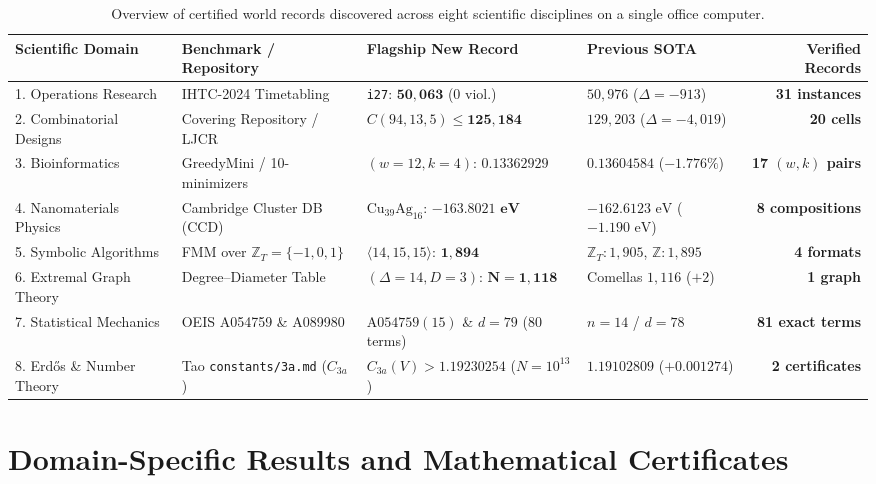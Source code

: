 \documentclass[11pt,a4paper]{article}
\begin{document}
\begin{table}[htbp]
\centering
\caption{Overview of certified world records discovered across eight scientific disciplines on a single office computer.}
\label{tab:summary}
\small
\begin{tabular}{@{}llllr@{}}
\toprule
\textbf{Scientific Domain} & \textbf{Benchmark / Repository} & \textbf{Flagship New Record} & \textbf{Previous SOTA} & \textbf{Verified Records} \\
\midrule
1. Operations Research & IHTC-2024 Timetabling & \texttt{i27}: $\mathbf{50{,}063}$ ($0$ viol.) & $50{,}976$ ($\Delta = -913$) & \textbf{31 instances} \\
2. Combinatorial Designs & Covering Repository / LJCR & $C(94,13,5) \le \mathbf{125{,}184}$ & $129{,}203$ ($\Delta = -4{,}019$) & \textbf{20 cells} \\
3. Bioinformatics & GreedyMini / 10-minimizers & $(w{=}12,k{=}4)$: $\mathbf{0.13362929}$ & $0.13604584$ ($-1.776\%$) & \textbf{17 $(w,k)$ pairs} \\
4. Nanomaterials Physics & Cambridge Cluster DB (CCD) & $\text{Cu}_{39}\text{Ag}_{16}$: $\mathbf{-163.8021\text{ eV}}$ & $-162.6123\text{ eV}$ ($-1.190\text{ eV}$) & \textbf{8 compositions} \\
5. Symbolic Algorithms & FMM over $\mathbb{Z}_T=\{-1,0,1\}$ & $\langle 14,15,15\rangle$: $\mathbf{1{,}894}$ & $\mathbb{Z}_T{:}1{,}905$, $\mathbb{Z}{:}1{,}895$ & \textbf{4 formats} \\
6. Extremal Graph Theory & Degree--Diameter Table & $(\Delta{=}14,D{=}3)$: $\mathbf{N=1{,}118}$ & Comellas $1{,}116$ ($+2$) & \textbf{1 graph} \\
7. Statistical Mechanics & OEIS A054759 \& A089980 & $\text{A054759}(15)$ \& $d{=}79$ (80 terms) & $n=14$ / $d=78$ & \textbf{81 exact terms} \\
8. Erd\H{o}s \& Number Theory & Tao \texttt{constants/3a.md} ($C_{3a}$) & $C_{3a}(V) > \mathbf{1.19230254}$ ($N{=}10^{13}$) & $1.19102809$ ($+0.001274$) & \textbf{2 certificates} \\
\bottomrule
\end{tabular}
\end{table}

\section{Domain-Specific Results and Mathematical Certificates}
\end{document}
